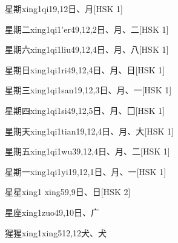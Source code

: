 \begin{entry}{星期}{xing1qi1}{9,12}{⽇、⽉}[HSK 1]
\end{entry}

\begin{entry}{星期二}{xing1qi1'er4}{9,12,2}{⽇、⽉、⼆}[HSK 1]
\end{entry}

\begin{entry}{星期六}{xing1qi1liu4}{9,12,4}{⽇、⽉、⼋}[HSK 1]
\end{entry}

\begin{entry}{星期日}{xing1qi1ri4}{9,12,4}{⽇、⽉、⽇}[HSK 1]
\end{entry}

\begin{entry}{星期三}{xing1qi1san1}{9,12,3}{⽇、⽉、⼀}[HSK 1]
\end{entry}

\begin{entry}{星期四}{xing1qi1si4}{9,12,5}{⽇、⽉、⼞}[HSK 1]
\end{entry}

\begin{entry}{星期天}{xing1qi1tian1}{9,12,4}{⽇、⽉、⼤}[HSK 1]
\end{entry}

\begin{entry}{星期五}{xing1qi1wu3}{9,12,4}{⽇、⽉、⼆}[HSK 1]
\end{entry}

\begin{entry}{星期一}{xing1qi1yi1}{9,12,1}{⽇、⽉、⼀}[HSK 1]
\end{entry}

\begin{entry}{星星}{xing1 xing5}{9,9}{⽇、⽇}[HSK 2]
\end{entry}

\begin{entry}{星座}{xing1zuo4}{9,10}{⽇、⼴}
\end{entry}

\begin{entry}{猩猩}{xing1xing5}{12,12}{⽝、⽝}
\end{entry}

